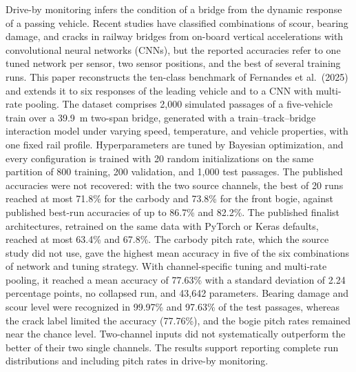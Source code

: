 Drive-by monitoring infers the condition of a bridge from the dynamic response
of a passing vehicle. Recent studies have classified combinations of scour,
bearing damage, and cracks in railway bridges from on-board vertical
accelerations with convolutional neural networks (CNNs), but the reported
accuracies refer to one tuned network per sensor, two sensor positions, and the
best of several training runs. This paper reconstructs the ten-class benchmark
of Fernandes et al.\ (2025) and extends it to six responses of the leading
vehicle and to a CNN with multi-rate pooling. The dataset comprises 2,000
simulated passages of a five-vehicle train over a 39.9~m two-span bridge,
generated with a train--track--bridge interaction model under varying speed,
temperature, and vehicle properties, with one fixed rail profile.
Hyperparameters are tuned by Bayesian optimization, and every configuration is
trained with 20 random initializations on the same partition of 800 training,
200 validation, and 1,000 test passages. The published accuracies were not
recovered: with the two source channels, the best of 20 runs reached at most
71.8\% for the carbody and 73.8\% for the front bogie, against published
best-run accuracies of up to 86.7\% and 82.2\%. The published finalist
architectures, retrained on the same data with PyTorch or Keras defaults,
reached at most 63.4\% and 67.8\%. The carbody pitch rate, which
the source study did not use, gave the highest mean accuracy in five of the six
combinations of network and tuning strategy. With channel-specific tuning and
multi-rate pooling, it reached a mean accuracy of 77.63\% with a standard
deviation of 2.24 percentage points, no collapsed run, and 43,642 parameters.
Bearing damage and scour level were recognized in 99.97\% and 97.63\% of the
test passages, whereas the crack label limited the accuracy (77.76\%), and the
bogie pitch rates remained near the chance level. Two-channel inputs did not
systematically outperform the better of their two single channels. The results
support reporting complete run distributions and including pitch rates in
drive-by monitoring.
